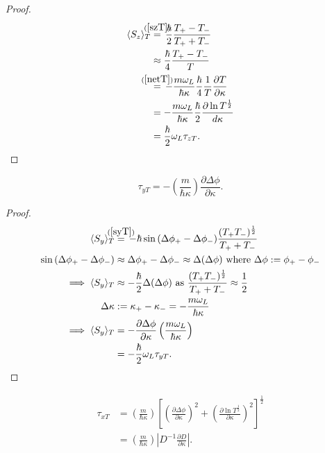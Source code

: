 \documentclass{article}
\begin{document}
\begin{proof}
\begin{subequations}
\begin{align}
	\langle S_z \rangle_T &\stackrel{\mathclap{(\ref{szT})}}{=}\,\frac{\hbar}{2}\frac{T_+-T_-}{T_++T_-}\\
	&\approx \frac{\hbar}{4}\frac{T_+-T_-}{T}\\
	&\stackrel{\mathclap{(\ref{netT})}}{=}\,-\frac{m\omega_L}{\hbar\kappa}\frac{\hbar}{4}\frac{1}{T}\frac{\partial T}{\partial \kappa} \\
	&=-\frac{m\omega_L}{\hbar\kappa}\frac{\hbar}{2}\frac{\partial\ln{T^{\frac{1}{2}}}}{d\kappa} \\
	&=\frac{\hbar}{2}\omega_L\tau_{zT}.
\end{align}
\end{subequations}
\end{proof}

\begin{equation}
	\tau_{yT} = -\left(\frac{m}{\hbar\kappa}\right)\frac{\partial\Delta\phi}{\partial\kappa}. \label{tauy}
\end{equation}

\begin{proof}
\begin{subequations}
\begin{align}
	\langle S_y \rangle_T &\stackrel{\mathclap{(\ref{syT})}}{=}\,-\hbar \sin{(\Delta\phi_+-\Delta\phi_-)}\frac{(T_+T_-)^{\frac{1}{2}}}{T_++T_-}\\
	\sin{(\Delta\phi_+-\Delta\phi_-)} &\approx \Delta\phi_+-\Delta\phi_- \approx \Delta(\Delta\phi) \text{ where } \Delta\phi := \phi_+-\phi_-\\
	\implies \langle S_y \rangle_T &\approx -\frac{\hbar}{2}\Delta(\Delta\phi) \text{ as } \frac{(T_+T_-)^{\frac{1}{2}}}{T_++T_-} \approx \frac{1}{2} \\
	\Delta\kappa &:= \kappa_+-\kappa_- = -\frac{m\omega_L}{\hbar\kappa} \\
\implies \langle S_y \rangle_T &= -\frac{\partial\Delta\phi}{\partial\kappa}\left(\frac{m\omega_L}{\hbar\kappa}\right) \\
			       &=-\frac{\hbar}{2}\omega_L\tau_{yT}.
\end{align}
\end{subequations}
\end{proof}

\begin{subequations}\label{taux}
\begin{align}
	\tau_{xT} &= \left(\frac{m}{\hbar\kappa}\right)\left[\left(\frac{\partial\Delta\phi}{\partial\kappa}\right)^2+\left(\frac{\partial\ln{T^{\frac{1}{2}}}}{\partial\kappa}\right)^2\right]^{\frac{1}{2}}\label{tauxpart1} \\
	       &=\left(\frac{m}{\hbar\kappa}\right)\left|D^{-1}\frac{\partial D}{\partial\kappa}\right|. \label{tauxpart2}
\end{align}
\end{subequations}
\end{document}
